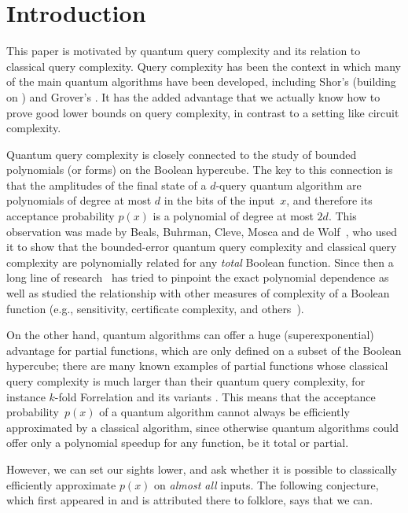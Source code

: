 \section{Introduction}

This paper is motivated by quantum query complexity and its relation to classical query complexity. Query complexity has been the context in which many of the main quantum algorithms have been developed, including Shor's \cite{Shor97} (building on \cite{Simon97}) and Grover's \cite{G96}. It has the added advantage that we actually know how to prove good lower bounds on query complexity, in contrast to a setting like circuit complexity. 

Quantum query complexity is closely connected to the study of bounded polynomials (or forms) on the Boolean hypercube. The key to this connection is that the amplitudes of the final state of a $d$-query quantum algorithm are polynomials of degree at most $d$ in the bits of the input~$x$, and therefore its acceptance probability $p(x)$ is a polynomial of degree at most $2d$. This observation was made by Beals, Buhrman, Cleve, Mosca and de Wolf~\cite{BBCMW01}, who used it to show that the bounded-error quantum query complexity and classical query complexity are polynomially related for any \emph{total} Boolean function. Since then a long line of research~\cite{ambainis:degreevsqueryj, ABK16, BHT17, ABBLSS17, T20, ABKRT20, BS21, SSW21} has tried to pinpoint the exact polynomial dependence as well as studied the relationship with other measures of complexity of a Boolean function (e.g., sensitivity, certificate complexity, and others~\cite{nisan&szegedy:degree,BdW02,BSS03}).

On the other hand, quantum algorithms can offer a huge (superexponential) advantage for partial functions, which are only defined on a subset of the Boolean hypercube; there are many known examples of partial functions whose classical query complexity is much larger than their quantum query complexity, for instance $k$-fold Forrelation and its variants \cite{AA:forrelation, T20, BS21, SSW21}. This means that the acceptance probability~$p(x)$ of a quantum algorithm cannot always be efficiently approximated  by a classical algorithm, since otherwise quantum algorithms could offer only a polynomial speedup for any function, be it total or partial. 





However, we can set our sights lower, and ask whether it is possible to classically efficiently approximate $p(x)$ on \emph{almost all} inputs. 
The following conjecture, which first appeared in \cite{AA14} and is  attributed there to folklore, says that we can.


